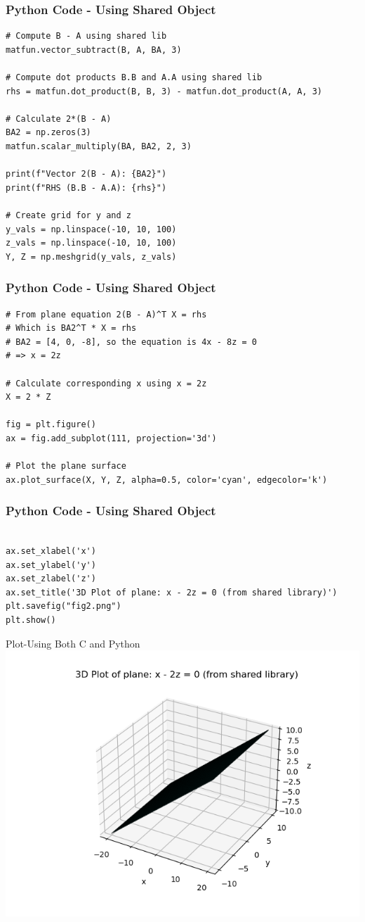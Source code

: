 \documentclass{beamer}
\numberwithin{equation}{section}
\begin{document}
\begin{frame}[fragile]
    \frametitle{Python Code - Using Shared Object}
    \begin{lstlisting}
# Compute B - A using shared lib
matfun.vector_subtract(B, A, BA, 3)

# Compute dot products B.B and A.A using shared lib
rhs = matfun.dot_product(B, B, 3) - matfun.dot_product(A, A, 3)

# Calculate 2*(B - A)
BA2 = np.zeros(3)
matfun.scalar_multiply(BA, BA2, 2, 3)

print(f"Vector 2(B - A): {BA2}")
print(f"RHS (B.B - A.A): {rhs}")

# Create grid for y and z
y_vals = np.linspace(-10, 10, 100)
z_vals = np.linspace(-10, 10, 100)
Y, Z = np.meshgrid(y_vals, z_vals)
\end{lstlisting}
\end{frame}
\begin{frame}[fragile]
    \frametitle{Python Code - Using Shared Object}
    \begin{lstlisting}
# From plane equation 2(B - A)^T X = rhs
# Which is BA2^T * X = rhs
# BA2 = [4, 0, -8], so the equation is 4x - 8z = 0
# => x = 2z

# Calculate corresponding x using x = 2z
X = 2 * Z

fig = plt.figure()
ax = fig.add_subplot(111, projection='3d')

# Plot the plane surface
ax.plot_surface(X, Y, Z, alpha=0.5, color='cyan', edgecolor='k')

\end{lstlisting}
\end{frame}
\begin{frame}[fragile]
    \frametitle{Python Code - Using Shared Object}
    \begin{lstlisting}

ax.set_xlabel('x')
ax.set_ylabel('y')
ax.set_zlabel('z')
ax.set_title('3D Plot of plane: x - 2z = 0 (from shared library)')
plt.savefig("fig2.png")
plt.show()

\end{lstlisting}
\end{frame}

\begin{frame}{Plot-Using Both C and Python}
    \centering
    \includegraphics[width=\columnwidth, height=0.8\textheight, keepaspectratio]{FIG/fig2.png}     
\end{frame}
\end{document}
